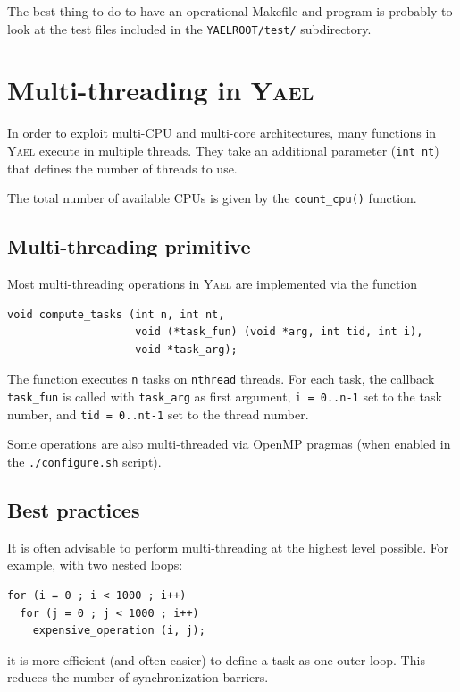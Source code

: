 \documentclass[a4paper,11pt,notitlepage,final,twoside]{report}
\newcommand{\yael}{\textsc{Yael}\xspace}
\newcommand{\yroot}{\texttt{YAELROOT}\xspace}
\newcommand{\tc}[1]{\texttt{#1}}
\begin{document}
The best thing to do to have an operational Makefile and program 
is probably to look at the test files included in the 
\tc{\yroot/test/} subdirectory. 
\bigskip

\section{Multi-threading in \yael}

In order to exploit multi-CPU and multi-core architectures, many functions in \yael execute in multiple threads. They take an additional parameter (\tc{int nt}) that defines the number of threads to use. 

The total number of available CPUs is given by the \tc{count\_cpu()} function. 

\subsection{Multi-threading primitive}

Most multi-threading operations in \yael are implemented via the function 
\begin{verbatim}
void compute_tasks (int n, int nt,
                    void (*task_fun) (void *arg, int tid, int i),
                    void *task_arg);
\end{verbatim}

The function executes \tc{n} tasks on \tc{nthread} threads. For each task, the callback \tc{task\_fun} is called with \tc{task\_arg} as first argument, \tc{i = 0..n-1} set to the task number, and \tc{tid = 0..nt-1} set to the thread number. 

Some operations are also multi-threaded via OpenMP pragmas (when enabled in the \tc{./configure.sh} script).


\subsection{Best practices}

It is often advisable to perform multi-threading at the highest level possible. For example, with two nested loops: 

\begin{verbatim}
for (i = 0 ; i < 1000 ; i++)    
  for (j = 0 ; j < 1000 ; i++) 
    expensive_operation (i, j);
\end{verbatim}

it is more efficient (and often easier) to define a task as one outer loop. This reduces the number of synchronization barriers. 
\end{document}
